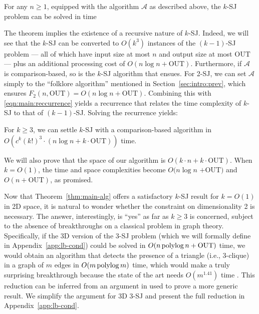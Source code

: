 \documentclass[sigconf]{acmart}
\def\vgap{\vspace{1mm}}
\def\A{\mathcal{A}}
\def\out{\mathrm{OUT}}
\begin{document}
\begin{theorem} \label{thm:main-recur}
    For any $n \ge 1$, equipped with the algorithm $\A$ as described above, the $k$-SJ problem can be solved in time
    \myeqn{
        O(k^3) \cdot \big( F_{k-1}(n, \out) + n \log n + k \cdot \out \big).
        \nn
    }
\end{theorem}

The theorem implies the existence of a recursive nature of $k$-SJ. Indeed, we will see that the $k$-SJ can be converted to $O(k^3)$ instances of the $(k-1)$-SJ problem --- all of which have input size at most $n$ and output size at most $\out$ --- plus an additional processing cost of $O(n \log n + \out)$. Furthermore, if $\A$ is comparison-based, so is the $k$-SJ algorithm that ensues. For 2-SJ, we can set $\A$ simply to the ``folklore algorithm'' mentioned in Section~\ref{sec:intro:prev}, which ensures $F_2(n, \out) = O(n \log n + \out)$. Combining this with \eqref{eqn:main:reccurrence} yields a recurrence that relates the time complexity of $k$-SJ to that of $(k-1)$-SJ. Solving the recurrence yields:

\begin{theorem} \label{thm:main-alg}
    For $k \ge 3$, we can settle $k$-SJ with a comparison-based algorithm in $O( c^k (k!)^3 \cdot (n \log n + k \cdot \out))$ time.
\end{theorem}


We will also prove that the space of our algorithm is $O(k \cdot n + k \cdot \out)$. When $k = O(1)$, the time and space complexities become $O(n \log n$ $+ \out)$ and $O(n + \out)$, as promised.

\vgap 

Now that Theorem~\ref{thm:main-alg} offers a satisfactory $k$-SJ result for $k = O(1)$ in 2D space, it is natural to wonder whether the constraint on dimensionality 2 is necessary. The answer, interestingly, is ``yes'' as far as $k \ge 3$ is concerned, subject to the absence of breakthroughs on a classical problem in graph theory. Specifically, if the 3D version of the 3-SJ problem (which we will formally define in Appendix~\ref{app:lb-cond}) could be solved in $O(n \polylog n + \out)$ time, we would obtain an algorithm that detects the presence of a triangle (i.e., 3-clique) in a graph of $m$ edges in $O(m \operatorname*{polylog} m)$ time, which would make a truly surprising breakthrough because the state of the art needs $O(m^{1.41})$ time \cite{ayz97}. This reduction can be inferred from an argument in \cite{kcko22} used to prove a more generic result. We simplify the argument for 3D 3-SJ and present the full reduction in Appendix~\ref{app:lb-cond}.
\end{document}

